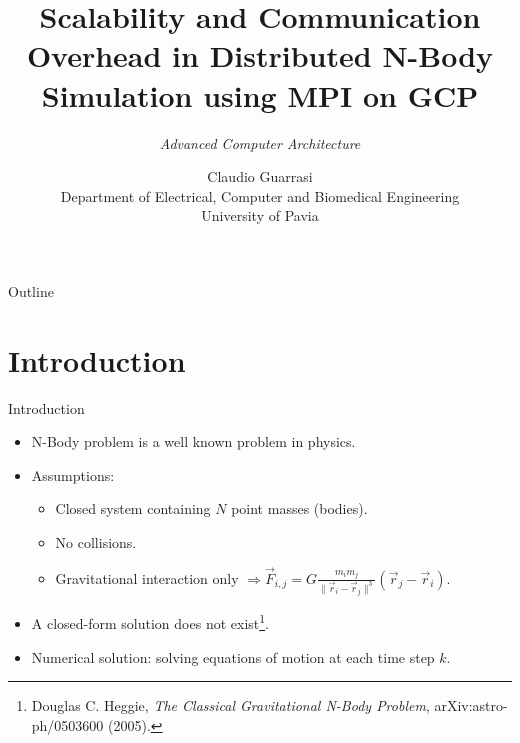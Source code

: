 \documentclass{beamer}
\title{Scalability and Communication Overhead in Distributed N-Body Simulation using MPI on GCP}
\subtitle{\textit{Advanced Computer Architecture}}
\author{Claudio Guarrasi \\ \small{Department of Electrical, Computer and Biomedical Engineering} \\ \small{University of Pavia}}
\institute{}
\date{}
\begin{document}
\maketitle

\begin{frame}{Outline}
  \tableofcontents
\end{frame}

\section{Introduction}
\begin{frame}{Introduction}
\begin{itemize}
	\item N-Body problem is a well known problem in physics.
	\item Assumptions:
	\begin{itemize}
		\item Closed system containing $N$ point masses (bodies).
		\item No collisions.
		\item Gravitational interaction only $\Rightarrow \vec{F}_{i,j}=G\frac{m_{i} m_{j}}{\|\vec{r}_{i}-\vec{r}_{j}\|^3}(\vec{r}_{j}-\vec{r}_{i})$.
	\end{itemize}
	\item A closed-form solution does not exist\footnote{Douglas C. Heggie, \emph{The Classical Gravitational N-Body Problem}, arXiv:astro-ph/0503600 (2005).}.
	\item Numerical solution: solving equations of motion at each time step $k$.	
\end{itemize}
\end{frame}
\end{document}
